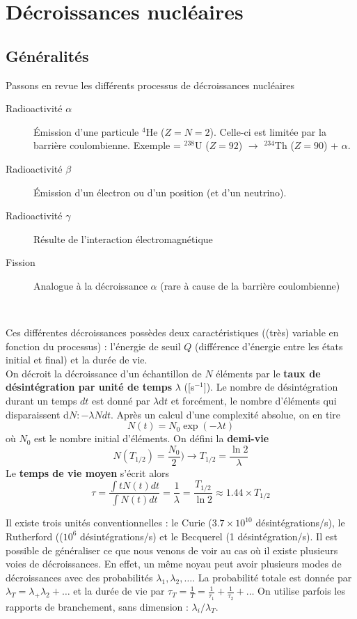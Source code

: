 \chapter{Décroissances nucléaires}
\section{Généralités}
Passons en revue les différents processus de décroissances nucléaires
\begin{description}
\item[Radioactivité $\alpha$] Émission d'une particule $^4$He ($Z=N=2$). Celle-ci est limitée par la 
barrière coulombienne. Exemple = $^238$U ($Z=92$) $\to$ $^{234}$Th ($Z=90$) + $\alpha$.
\item[Radioactivité $\beta$] Émission d'un électron ou d'un position (et d'un neutrino). 
\item[Radioactivité $\gamma$] Résulte de l'interaction électromagnétique
\item[Fission] Analogue à la décroissance $\alpha$ (rare à cause de la barrière coulombienne)
\end{description}\ 

Ces différentes décroissances possèdes deux caractéristiques ((très) variable en fonction du processus) : 
l'énergie de seuil $Q$ (différence d’énergie entre les états initial et final) et la durée de vie.\\

On décroit la décroissance d'un échantillon de $N$ éléments par le \textbf{taux de désintégration par
unité de temps} $\lambda$ ([s$^{-1}$]). Le nombre de désintégration durant un temps $dt$ est donné par
$\lambda$d$t$ et forcément, le nombre d'éléments qui disparaissent d$N : -\lambda Ndt$. Après un calcul
d'une complexité absolue, on en tire
\begin{equation}
N(t) = N_0\exp(-\lambda t)
\end{equation}
où $N_0$ est le nombre initial d'éléments. On défini la \textbf{demi-vie}
\begin{equation}
N(T_{1/2}) = \frac{N_0}{2}) \to T_{1/2} = \frac{\ln 2}{\lambda}
\end{equation}
Le \textbf{temps de vie moyen} s'écrit alors 
\begin{equation}
\tau = \frac{\int t N(t)dt}{\int  N(t)dt} = \frac{1}{\lambda} = \frac{T_{1/2}}{\ln 2} \approx 1.44\times T_{1/2}
\end{equation}

Il existe trois unités conventionnelles : le Curie ($3.7\times 10^{10}$ désintégrations/s), le
Rutherford (($10^{6}$ désintégrations/s) et le Becquerel (1 désintégration/s). Il est possible de 
généraliser ce que nous venons de voir au cas où il existe plusieurs voies de décroissances. En effet, un
même noyau peut avoir plusieurs modes de décroissances avec des probabilités $\lambda_1,\lambda_2,\dots$. La
probabilité totale est donnée par $\lambda_T = \lambda_+\lambda_2+\dots$ et la durée de vie par
$\tau_T = \frac{1}{T}=\frac{1}{\tau_1}+\frac{1}{\tau_2}+\dots$ On utilise parfois les rapports de branchement,
sans dimension : $\lambda_i/\lambda_T$.\\

